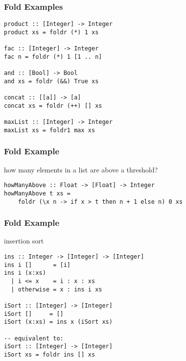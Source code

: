 \documentclass[dvipsnames]{beamer}
\theoremstyle{plain}
\begin{document}
\begin{frame}[fragile]
  \frametitle{Fold Examples}

  \begin{exampleblock}{}
    \begin{lstlisting}[deletekeywords={and, concat, product}]
product :: [Integer] -> Integer
product xs = foldr (*) 1 xs

fac :: [Integer] -> Integer
fac n = foldr (*) 1 [1 .. n]

and :: [Bool] -> Bool
and xs = foldr (&&) True xs

concat :: [[a]] -> [a]
concat xs = foldr (++) [] xs

maxList :: [Integer] -> Integer
maxList xs = foldr1 max xs
    \end{lstlisting}
  \end{exampleblock}
\end{frame}

\begin{frame}[fragile]
  \frametitle{Fold Example}

  \begin{exampleblock}{how many elements in a list are above a threshold?}
    \begin{lstlisting}
howManyAbove :: Float -> [Float] -> Integer
howManyAbove t xs =
    foldr (\x n -> if x > t then n + 1 else n) 0 xs
    \end{lstlisting}
  \end{exampleblock}
\end{frame}

\begin{frame}[fragile]
  \frametitle{Fold Example}

  \begin{exampleblock}{insertion sort}
    \begin{lstlisting}
ins :: Integer -> [Integer] -> [Integer]
ins i []      = [i]
ins i (x:xs)
  | i <= x    = i : x : xs
  | otherwise = x : ins i xs

iSort :: [Integer] -> [Integer]
iSort []     = []
iSort (x:xs) = ins x (iSort xs)

-- equivalent to:
iSort :: [Integer] -> [Integer]
iSort xs = foldr ins [] xs
    \end{lstlisting}
  \end{exampleblock}
\end{frame}
\end{document}
